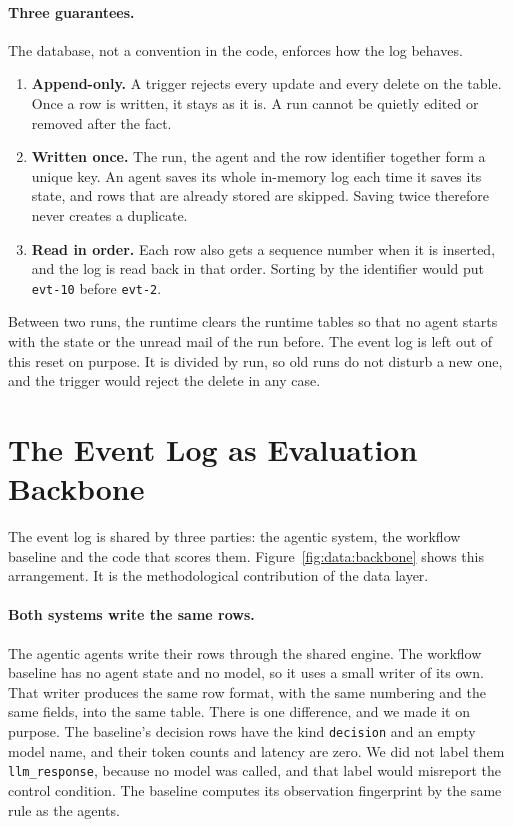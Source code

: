 \paragraph{Three guarantees.} The database, not a convention in the code,
enforces how the log behaves.
\begin{enumerate}
  \item \textbf{Append-only.} A trigger rejects every update and every delete
  on the table. Once a row is written, it stays as it is. A run cannot be
  quietly edited or removed after the fact.
  \item \textbf{Written once.} The run, the agent and the row identifier
  together form a unique key. An agent saves its whole in-memory log each time
  it saves its state, and rows that are already stored are skipped. Saving
  twice therefore never creates a duplicate.
  \item \textbf{Read in order.} Each row also gets a sequence number when it is
  inserted, and the log is read back in that order. Sorting by the identifier
  would put \texttt{evt-10} before \texttt{evt-2}.
\end{enumerate}

Between two runs, the runtime clears the runtime tables so that no agent
starts with the state or the unread mail of the run before. The event log is
left out of this reset on purpose. It is divided by run, so old runs do not
disturb a new one, and the trigger would reject the delete in any case.

\section{The Event Log as Evaluation Backbone}
\label{sec:data:evalbackbone}

The event log is shared by three parties: the agentic system, the workflow
baseline and the code that scores them. Figure~\ref{fig:data:backbone} shows
this arrangement. It is the methodological contribution of the data layer.



\paragraph{Both systems write the same rows.} The agentic agents write their
rows through the shared engine. The workflow baseline has no agent state and
no model, so it uses a small writer of its own. That writer produces the same
row format, with the same numbering and the same fields, into the same table.
There is one difference, and we made it on purpose. The baseline's decision
rows have the kind \texttt{decision} and an empty model name, and their token
counts and latency are zero. We did not label them \texttt{llm\_response},
because no model was called, and that label would misreport the control
condition. The baseline computes its observation fingerprint by the same rule
as the agents.

